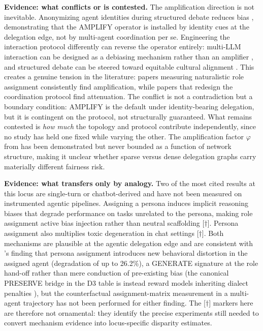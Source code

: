 \documentclass[10pt]{article}
\begin{document}
\textbf{Evidence: what conflicts or is contested.} The amplification direction is not inevitable. Anonymizing agent identities during structured debate reduces bias \cite{choi2025identity}, demonstrating that the AMPLIFY operator is installed by identity cues at the delegation edge, not by multi-agent coordination per se. Engineering the interaction protocol differently can reverse the operator entirely: multi-LLM interaction can be designed as a debiasing mechanism rather than an amplifier \cite{owens2024multi}, and structured debate can be steered toward equitable cultural alignment \cite{ki2025multiple}. This creates a genuine tension in the literature: papers measuring naturalistic role assignment consistently find amplification, while papers that redesign the coordination protocol find attenuation. The conflict is not a contradiction but a boundary condition: AMPLIFY is the default under identity-bearing delegation, but it is contingent on the protocol, not structurally guaranteed. What remains contested is \emph{how much} the topology and protocol contribute independently, since no study has held one fixed while varying the other. The amplification factor $\varphi$ from \cite{nguyen2025social} has been demonstrated but never bounded as a function of network structure, making it unclear whether sparse versus dense delegation graphs carry materially different fairness risk.

\textbf{Evidence: what transfers only by analogy.} Two of the most cited results at this locus are single-turn or chatbot-derived and have not been measured on instrumented agentic pipelines. Assigning a persona induces implicit reasoning biases that degrade performance on tasks unrelated to the persona, making role assignment active bias injection rather than neutral scaffolding \cite{gupta2023bias}[$\dagger$]. Persona assignment also multiplies toxic degeneration in chat settings \cite{deshpande2023toxicity}[$\dagger$]. Both mechanisms are plausible at the agentic delegation edge and are consistent with \cite{cao2026from}'s finding that persona assignment introduces new behavioral distortion in the assigned agent (degradation of up to 26.2\%), a GENERATE signature at the role hand-off rather than mere conduction of pre-existing bias (the canonical PRESERVE bridge in the D3 table is instead reward models inheriting dialect penalties \cite{mire2025rejected}), but the counterfactual assignment-matrix measurement in a multi-agent trajectory has not been performed for either finding. The [$\dagger$] markers here are therefore not ornamental: they identify the precise experiments still needed to convert mechanism evidence into locus-specific disparity estimates.
\end{document}
